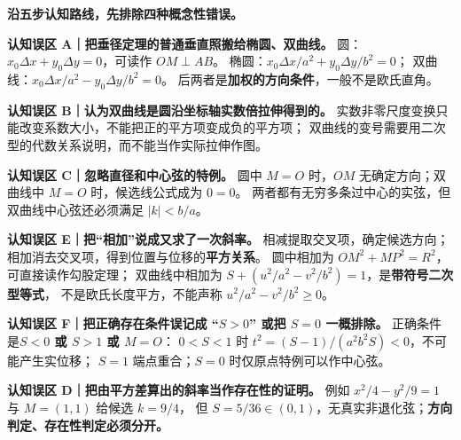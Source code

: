 
\clearpage
\begin{trapbox}
\textbf{沿五步认知路线，先排除四种概念性错误。}
\par\smallskip\noindent
\textbf{认知误区 A｜把垂径定理的普通垂直照搬给椭圆、双曲线。}
圆：$x_0\Delta x+y_0\Delta y=0$，可读作 $OM\perp AB$。
椭圆：$x_0\Delta x/a^2+y_0\Delta y/b^2=0$；
双曲线：$x_0\Delta x/a^2-y_0\Delta y/b^2=0$。
后两者是\textbf{加权的方向条件}，一般不是欧氏直角。
\par\medskip\noindent
\textbf{认知误区 B｜认为双曲线是圆沿坐标轴实数倍拉伸得到的。}
实数非零尺度变换只能改变系数大小，不能把正的平方项变成负的平方项；
双曲线的变号需要用二次型的代数关系说明，而不能当作实际拉伸作图。
\par\medskip\noindent
\textbf{认知误区 C｜忽略直径和中心弦的特例。}
圆中 $M=O$ 时，$OM$ 无确定方向；双曲线中 $M=O$ 时，候选线公式成为 $0=0$。
两者都有无穷多条过中心的实弦，但双曲线中心弦还必须满足 $|k|<b/a$。
\par\medskip\noindent
\textbf{认知误区 E｜把``相加''说成又求了一次斜率。}
相减提取交叉项，确定候选方向；相加消去交叉项，得到位置与位移的\textbf{平方关系}。
圆中相加为 $OM^2+MP^2=R^2$，可直接读作勾股定理；
双曲线中相加为
$S+(u^2/a^2-v^2/b^2)=1$，是\textbf{带符号二次型等式}，
不是欧氏长度平方，不能声称 $u^2/a^2-v^2/b^2\ge0$。
\par\medskip\noindent
\textbf{认知误区 F｜把正确存在条件误记成 ``$S>0$'' 或把 $S=0$ 一概排除。}
正确条件是\textbf{$S<0$ 或 $S>1$ 或 $M=O$}：
$0<S<1$ 时 $t^2=(S-1)/(a^2b^2S)<0$，不可能产生实位移；
$S=1$ 端点重合；$S=0$ 时仅原点特例可以作中心弦。
\par\medskip\noindent
\textbf{认知误区 D｜把由平方差算出的斜率当作存在性的证明。}
例如 $x^2/4-y^2/9=1$ 与 $M=(1,1)$ 给候选 $k=9/4$，
但 $S=5/36\in(0,1)$，无真实非退化弦；\textbf{方向判定、存在性判定必须分开。}
\end{trapbox}
\clearpage
